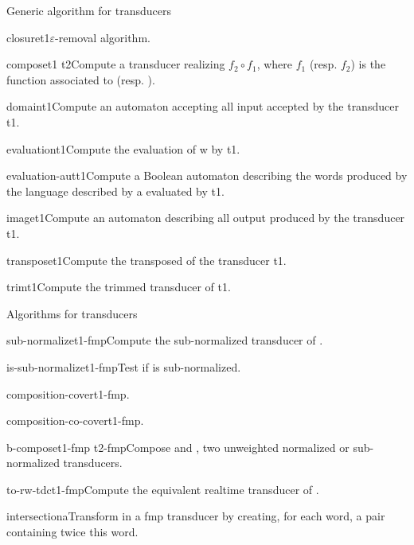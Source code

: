 \begin{fnsection}{Generic algorithm for transducers}
\item{closure}{t1}{$\varepsilon$-removal algorithm.}

\item{compose}{t1 t2}{Compute a transducer realizing $f_2 \circ f_1$,
    where $f_1$ (resp. $f_2$) is the function associated to 
    (resp. ).}

\item{domain}{t1}{Compute an automaton accepting all input accepted by
    the transducer t1.}

\item{evaluation}{t1}{Compute the evaluation of w by t1.}

\item{evaluation-aut}{t1}{Compute a Boolean automaton describing the
    words produced by the language described by a evaluated by t1.}

\item{image}{t1}{Compute an automaton describing all output produced
    by the transducer t1.}

\item{transpose}{t1}{Compute the transposed of the transducer t1.}

\item{trim}{t1}{Compute the trimmed transducer of t1.}  \hline
\end{fnsection}

\begin{fnsection}{Algorithms for transducers}
\item{sub-normalize}{t1-fmp}{Compute the sub-normalized transducer of
    .}
\item{is-sub-normalize}{t1-fmp}{Test if  is
    sub-normalized.}
\item{composition-cover}{t1-fmp}{.}%
\item{composition-co-cover}{t1-fmp}{.}%
\item{b-compose}{t1-fmp t2-fmp}{Compose  and
    , two unweighted normalized or sub-normalized
    transducers.}
\item{to-rw-tdc}{t1-fmp}{Compute the equivalent realtime transducer
    of .}
\item{intersection}{a}{Transform  in a fmp transducer by
    creating, for each word, a pair containing twice this word.}
  \hline
\end{fnsection}


